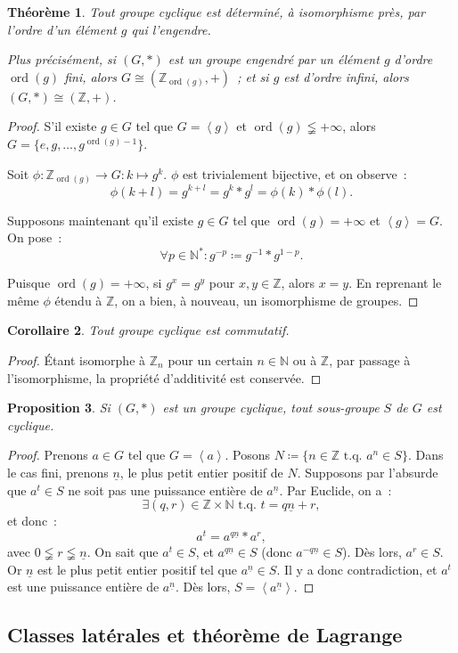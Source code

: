 \documentclass{article}
\newtheorem{thm}{Théorème}[section]
\newtheorem{prp}[thm]{Proposition}
\newtheorem{cor}[thm]{Corollaire}
\theoremstyle{definition}
\theoremstyle{remark}
\DeclareMathOperator{\ord}{ord}
\newcommand{\Z}{\mathbb Z}
\newcommand{\N}{\mathbb N}
\newcommand{\tq}{\text{ t.q. }}
\newcommand{\simeqq}{\cong}
\newcommand{\eng}[1]{\left\langle#1\right\rangle}
\begin{document}
		\begin{thm} Tout groupe cyclique est déterminé, à isomorphisme près, par l'ordre d'un élément $g$ qui l'engendre.

		Plus précisément, si $(G, *)$ est un groupe engendré par un élément $g$ d'ordre $\ord(g)$ fini, alors $G \simeqq (\Z_{\ord(g)}, +)$~; et si $g$ est
		d'ordre infini, alors $(G, *) \simeqq (\Z, +)$.
		\end{thm}

		\begin{proof} S'il existe $g \in G$ tel que $G = \eng g$ et $\ord(g) \lneqq +\infty$, alors $G = \{e, g, \ldots, g^{\ord(g)-1}\}$.

		Soit $\phi : \Z_{\ord(g)} \to G : k \mapsto g^k$. $\phi$ est trivialement bijective, et on observe~:
		\[\phi(k+l) = g^{k+l} = g^k * g^l = \phi(k) * \phi(l).\]

		Supposons maintenant qu'il existe $g \in G$ tel que $\ord(g) = +\infty$ et $\eng g = G$. On pose~:
		\[\forall p \in \N^* : g^{-p} \coloneqq g^{-1} * g^{1-p}.\]

		Puisque $\ord(g) = +\infty$, si $g^x = g^y$ pour $x, y \in \Z$, alors $x=y$. En reprenant le même $\phi$ étendu à $\Z$, on a bien, à nouveau, un
		isomorphisme de groupes.
		\end{proof}

		\begin{cor} Tout groupe cyclique est commutatif.
		\end{cor}

		\begin{proof} Étant isomorphe à $\Z_n$ pour un certain $n \in \N$ ou à $\Z$, par passage à l'isomorphisme, la propriété d'additivité est conservée.
		\end{proof}

		\begin{prp} Si $(G, *)$ est un groupe cyclique, tout sous-groupe $S$ de $G$ est cyclique.
		\end{prp}

		\begin{proof} Prenons $a \in G$ tel que $G = \eng a$. Posons $N \coloneqq \{n \in \Z \tq a^n \in S\}$. Dans le cas fini, prenons $\underline n$, le
		plus petit entier positif de $N$. Supposons par l'absurde que $a^t \in S$ ne soit pas une puissance entière de $a^{\underline n}$. Par Euclide, on a~:
		\[\exists (q, r) \in \Z \times \N \tq t = q\underline n + r,\]
		et donc~:
		\[a^t = a^{q\underline n} * a^r,\]
		avec $0 \lneqq r \lneqq \underline n$. On sait que $a^t \in S$, et $a^{q\underline n} \in S$ (donc $a^{-q\underline n} \in S$). Dès lors, $a^r \in S$.
		Or $\underline n$ est le plus petit entier positif tel que $a^{\underline n} \in S$. Il y a donc contradiction, et $a^t$ est une puissance entière de
		$a^{\underline n}$. Dès lors, $S = \eng {a^{\underline n}}$.
		\end{proof}

	\subsection{Classes latérales et théorème de Lagrange}
\end{document}
